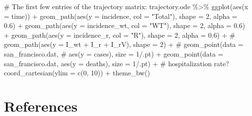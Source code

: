 \documentclass[
  11pt,
  letterpaper,
  DIV=11,
  numbers=noendperiod]{scrartcl}
\newenvironment{Shaded}{\begin{snugshade}}{\end{snugshade}}
\newcommand{\AttributeTok}[1]{\textcolor[rgb]{0.40,0.45,0.13}{#1}}
\newcommand{\CommentTok}[1]{\textcolor[rgb]{0.37,0.37,0.37}{#1}}
\newcommand{\DecValTok}[1]{\textcolor[rgb]{0.68,0.00,0.00}{#1}}
\newcommand{\FloatTok}[1]{\textcolor[rgb]{0.68,0.00,0.00}{#1}}
\newcommand{\FunctionTok}[1]{\textcolor[rgb]{0.28,0.35,0.67}{#1}}
\newcommand{\NormalTok}[1]{\textcolor[rgb]{0.00,0.23,0.31}{#1}}
\newcommand{\SpecialCharTok}[1]{\textcolor[rgb]{0.37,0.37,0.37}{#1}}
\newcommand{\StringTok}[1]{\textcolor[rgb]{0.13,0.47,0.30}{#1}}
\begin{document}
\begin{Shaded}
\begin{Highlighting}[]
\CommentTok{\# The first few entries of the trajectory matrix:}
\NormalTok{trajectory.ode }\SpecialCharTok{\%\textgreater{}\%}
    \FunctionTok{ggplot}\NormalTok{(}\FunctionTok{aes}\NormalTok{(}\AttributeTok{x =}\NormalTok{ time)) }\SpecialCharTok{+}
    \FunctionTok{geom\_path}\NormalTok{(}\FunctionTok{aes}\NormalTok{(}\AttributeTok{y =}\NormalTok{ incidence, }\AttributeTok{col =} \StringTok{"Total"}\NormalTok{), }\AttributeTok{shape =} \DecValTok{2}\NormalTok{, }\AttributeTok{alpha =} \FloatTok{0.6}\NormalTok{) }\SpecialCharTok{+}
    \FunctionTok{geom\_path}\NormalTok{(}\FunctionTok{aes}\NormalTok{(}\AttributeTok{y =}\NormalTok{ incidence\_wt, }\AttributeTok{col =} \StringTok{"WT"}\NormalTok{), }\AttributeTok{shape =} \DecValTok{2}\NormalTok{, }\AttributeTok{alpha =} \FloatTok{0.6}\NormalTok{) }\SpecialCharTok{+}
    \FunctionTok{geom\_path}\NormalTok{(}\FunctionTok{aes}\NormalTok{(}\AttributeTok{y =}\NormalTok{ incidence\_r, }\AttributeTok{col =} \StringTok{"R"}\NormalTok{), }\AttributeTok{shape =} \DecValTok{2}\NormalTok{, }\AttributeTok{alpha =} \FloatTok{0.6}\NormalTok{) }\SpecialCharTok{+}
    \CommentTok{\# geom\_path(aes(y = I\_wt + I\_r + I\_rV), shape = 2) +}
    \CommentTok{\# geom\_point(data = san\_francisco.dat,}
    \CommentTok{\#                    aes(y = cases), size = 1/.pt) +}
    \FunctionTok{geom\_point}\NormalTok{(}\AttributeTok{data =}\NormalTok{ san\_francisco.dat,}
                         \FunctionTok{aes}\NormalTok{(}\AttributeTok{y =}\NormalTok{ deaths), }\AttributeTok{size =} \DecValTok{1}\SpecialCharTok{/}\NormalTok{.pt) }\SpecialCharTok{+}
    \CommentTok{\# hospitalization rate?}
    \FunctionTok{coord\_cartesian}\NormalTok{(}\AttributeTok{ylim =} \FunctionTok{c}\NormalTok{(}\DecValTok{0}\NormalTok{, }\DecValTok{10}\NormalTok{)) }\SpecialCharTok{+}
    \FunctionTok{theme\_bw}\NormalTok{()}
\end{Highlighting}
\end{Shaded}

\newpage

\hypertarget{references}{%
\section*{References}\label{references}}
\end{document}
